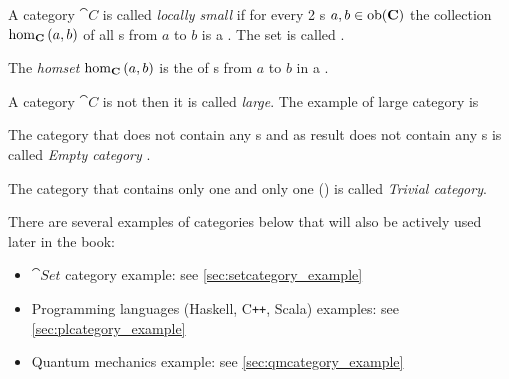 \begin{definition}
\label{def:localy_small_category}

A category $\cat{C}$ is called \textit{locally small} if 
for every 2 s $a,b \in \mathrm{ob}(\mathbf{C})$ the collection
$\catmset[C]{a}{b}$ of all s from $a$ to $b$ is
a . The set is called .
\end{definition}

\begin{definition}[Homset]
\label{def:homset}
The \textit{homset} $\catmset[C]{a}{b}$ is the  of
s from $a$ to $b$ in a
. 
\end{definition}


\begin{definition}
\label{def:large_category}
A category $\cat{C}$ is not  then it is
called \textit{large}. The example of large category is
\end{definition}

\begin{definition}
\label{def:empty_category}
The category that does not contain any s and as
result does not contain any s is called
\textit{Empty category} \cite{bib:stackexchange:empty_category}.
\end{definition}

\begin{definition}
\label{def:trivial_category}
The category that contains only one  and only
one  ()  is called
\textit{Trivial category}.
\end{definition}

There are several examples of categories below that will also be
actively used later in the book:
\begin{itemize}
\item $\cat{Set}$ category example: see \cref{sec:setcategory_example}
\item Programming languages (Haskell, C\texttt{++}, Scala) examples: see
  \cref{sec:plcategory_example}
\item Quantum mechanics example: see \cref{sec:qmcategory_example}
\end{itemize}

